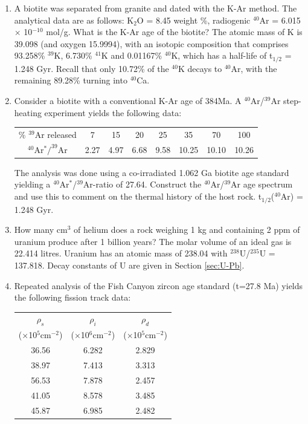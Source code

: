 \documentclass{book}
\begin{document}
\begin{enumerate}
\item A biotite was separated from granite and dated with the K-Ar
  method. The analytical data are as follows: K$_2$O = 8.45 weight \%,
  radiogenic $^{40}$Ar = 6.015 $\times$ 10$^{-10}$ mol/g.  What is the
  K-Ar age of the biotite? The atomic mass of K is 39.098 (and oxygen
  15.9994), with an isotopic composition that comprises 93.258\%
  $^{39}$K, 6.730\% $^{41}$K and 0.01167\% $^{40}$K, which has a
  half-life of t$_{1/2}$ = 1.248 Gyr. Recall that only 10.72\% of the
  $^{40}$K decays to $^{40}$Ar, with the remaining 89.28\% turning
  into $^{40}$Ca. 

\item Consider a biotite with a conventional K-Ar age of 384Ma. A
  $^{40}$Ar/$^{39}$Ar step-heating experiment yields the following
  data:

\begin{table}[!ht]
\centering
\begin{tabular}{c@{~}|@{~}c@{~}c@{~}c@{~}c@{~}c@{~}c@{~}c}
\% $^{39}$Ar released & 7 & 15 & 20 & 25 & 35 & 70 & 100\\
$^{40}$Ar$^*/^{39}$Ar & 2.27 & 4.97 & 6.68 & 9.58 & 10.25 & 10.10 & 10.26 \\
\end{tabular}
\end{table}

The analysis was done using a co-irradiated 1.062 Ga biotite age
standard yielding a $^{40}$Ar$^*$/$^{39}$Ar-ratio of 27.64.  Construct
the $^{40}$Ar/$^{39}$Ar age spectrum and use this to comment on the
thermal history of the host rock. t$_{1/2}$($^{40}$Ar) = 1.248
Gyr.\\ 

\item How many cm$^3$ of helium does a rock weighing 1 kg and
  containing 2 ppm of uranium produce after 1 billion years? The molar
  volume of an ideal gas is 22.414 litres. Uranium has an atomic mass
  of 238.04 with $^{238}$U/$^{235}$U = 137.818. Decay constants of U
  are given in Section \ref{sec:U-Pb}.

\item Repeated analysis of the Fish Canyon zircon age standard (t=27.8
  Ma) yields the following fission track data:

\begin{table}[!ht]
\centering
\begin{tabular}{ccc}
$\rho_s$ & $\rho_i$ & $\rho_d$ \\
($\times$10$^5$cm$^{-2}$) & ($\times$10$^6$cm$^{-2}$) & ($\times$10$^5$cm$^{-2}$)\\
\hline
36.56 & 6.282 & 2.829 \\
38.97 & 7.413 & 3.313 \\
56.53 & 7.878 & 2.457 \\
41.05 & 8.578 & 3.485 \\
45.87 & 6.985 & 2.482
\end{tabular}
\end{table}


\end{enumerate}
\end{document}
